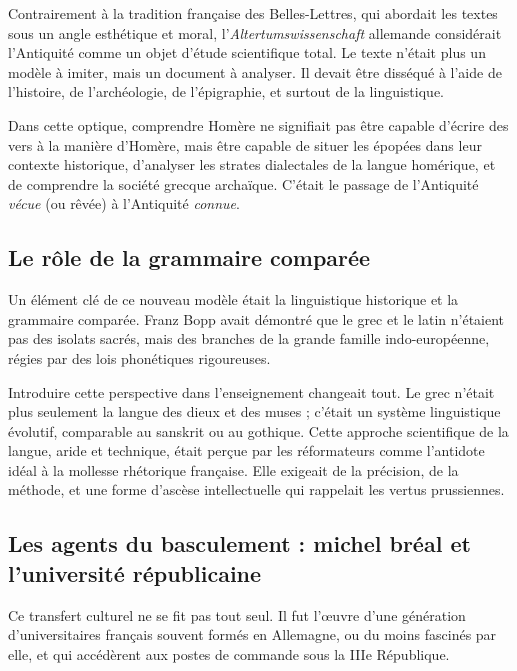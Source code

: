 Contrairement à la tradition française des \og Belles-Lettres\fg{}, qui abordait les textes sous un
angle esthétique et moral, l'\textit{Altertumswissenschaft} allemande considérait l'Antiquité comme
un objet d'étude scientifique total. Le texte n'était plus un modèle à imiter, mais un document à
analyser. Il devait être disséqué à l'aide de l'histoire, de l'archéologie, de l'épigraphie, et
surtout de la linguistique.\cite{I-1-1-ref21}

Dans cette optique, comprendre Homère ne signifiait pas être capable d'écrire des vers à la manière
d'Homère, mais être capable de situer les épopées dans leur contexte historique, d'analyser les
strates dialectales de la langue homérique, et de comprendre la société grecque archaïque. C'était
le passage de l'Antiquité \textit{vécue} (ou rêvée) à l'Antiquité \textit{connue}.\cite{I-1-1-ref20}



\subsection{Le rôle de la grammaire comparée}

Un élément clé de ce nouveau modèle était la linguistique historique et la grammaire comparée. Franz
Bopp avait démontré que le grec et le latin n'étaient pas des isolats sacrés, mais des branches de
la grande famille indo-européenne, régies par des lois phonétiques rigoureuses.\cite{I-1-1-ref22}

Introduire cette perspective dans l'enseignement changeait tout. Le grec n'était plus seulement la
langue des dieux et des muses ; c'était un système linguistique évolutif, comparable au sanskrit ou
au gothique. Cette approche \og scientifique\fg{} de la langue, aride et technique, était perçue par
les réformateurs comme l'antidote idéal à la \og mollesse\fg{} rhétorique française. Elle exigeait
de la précision, de la méthode, et une forme d'ascèse intellectuelle qui rappelait les vertus
prussiennes.\cite{I-1-1-ref22}



\subsection{Les agents du basculement : michel bréal et l'université républicaine}

Ce transfert culturel ne se fit pas tout seul. Il fut l'œuvre d'une génération d'universitaires
français souvent formés en Allemagne, ou du moins fascinés par elle, et qui accédèrent aux postes de
commande sous la IIIe République.



